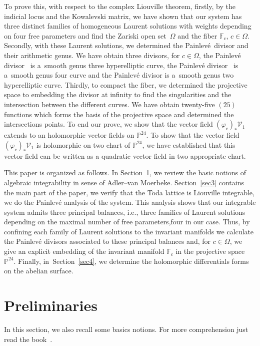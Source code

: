 \documentclass[10pt,a4paper]{amsart}
\numberwithin{equation}{section}
\begin{document}
To prove this, with respect to the complex Liouville theorem,
firstly, by the indicial locus and the Kowalevski matrix, we have
shown that our system has three distinct families of homogeneous
Laurent solutions with weights depending on four free parameters and
find the Zariski open set~$\Omega$ and the fiber $\mathbb{F}_c$,
$c \in \Omega$. Secondly, with these Laurent solutions, we determined
the Painlev\'{e}~divisor and their arithmetic genus. We have obtain
three divisors, for $c \in \Omega$, the Painlev\'e divisor~ is a~smooth genus three hyperelliptic
curve, the Painlev\'e divisor~ is a~smooth genus four curve and the Painlev\'e divisor
 is a~smooth genus two hyperelliptic
curve. Thirdly, to compact the fiber, we determined the projective
space to embedding the divisor at infinity to find the singularities
and the intersection between the different curves. We have obtain
twenty-five $(25)$ functions which forms the basis of the
projective space and determined the intersections points. To end our
prove, we show that the vector field
$(\varphi_c)_{\ast}\mathcal{V}_1$ extends to an
holomorphic vector fields on $\mathbb{P}^{24}$. To show that the
vector field $(\varphi_c)_{\ast}\mathcal{V}_1$ is
holomorphic on two chart of $\mathbb{P}^{24}$, we have established
that this vector field can be written as a quadratic vector field in
two appropriate chart.

This paper is organized as follows. In Section~\ref{sec2}, we review the
basic notions of algebraic integrability in sense of Adler--van Moerbeke. Section~\ref{sec3} contains the main part of the paper, we verify
that the  Toda lattice is Liouville
integrable, we do the Painlev\'{e} analysis of the system. This
analysis shows that our integrable system admits three principal
balances, i.e., three families of Laurent solutions depending on the
maximal number of free parameters,four in our case. Thus, by
confining each family of Laurent solutions to the invariant
manifolds we calculate the Painlev\'{e} divisors associated to these
principal balances and, for $c\in \Omega$, we give an explicit
embedding of the invariant manifold $\mathbb{F}_c$ in the
projective space $\mathbb{P}^{24}$. Finally, in~Section~\ref{sec4}, we
determine the holomorphic differentials forms on the abelian
surface.

\section{Preliminaries}\label{sec2}
In this section, we also recall some basics notions. For more
comprehension just read the book~\cite{al_Moer3}.
\end{document}
